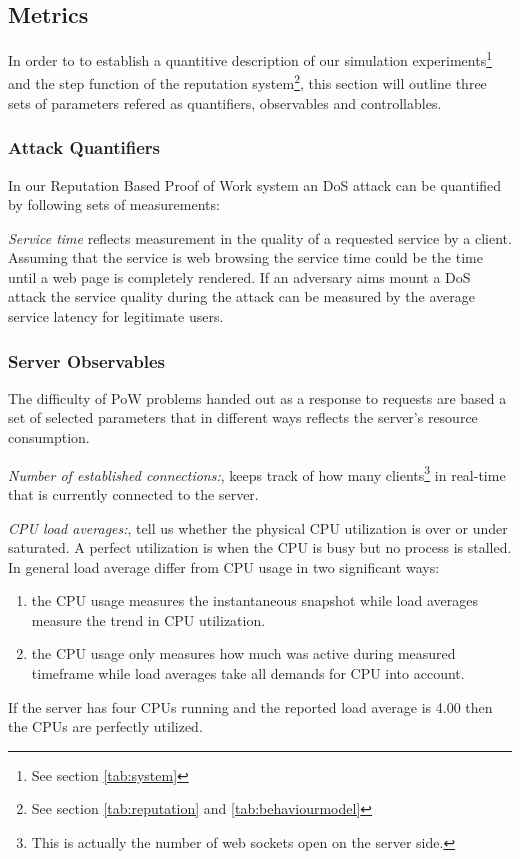 \subsection{Metrics}

In order to to establish a quantitive description of our simulation experiments\footnote{See section \ref{tab:system}} and the step function of the reputation system\footnote{See section \ref{tab:reputation} and \ref{tab:behaviourmodel}}, this section will outline three sets of parameters refered as quantifiers, observables and controllables. 

\subsubsection{Attack Quantifiers}
In our Reputation Based Proof of Work system an DoS attack can be quantified by following sets of measurements: 

\emph{Service time} reflects measurement in the quality of a requested service by a client. Assuming that the service is web browsing the service time could be the time until a web page is completely rendered. If an adversary aims mount a DoS attack the service quality during the attack can be measured by the average service latency for legitimate users. 

\subsubsection{Server Observables}
The difficulty of PoW problems handed out as a response to requests are based a set of selected parameters that in different ways reflects the server's resource consumption.

\emph{Number of established connections:}, keeps track of how many clients\footnote{This is actually the number of web sockets open on the server side.} in real-time that is currently connected to the server.

\emph{CPU load averages:}, tell us whether the physical CPU utilization is over or under saturated. A perfect utilization is when the CPU is busy but no process is stalled. In general load average differ from CPU usage in two significant ways:
\begin{enumerate}
\item the CPU usage measures the instantaneous snapshot while load averages measure the trend in CPU utilization.
\item the CPU usage only measures how much was active during measured timeframe while load averages take all demands for CPU into account.
\end{enumerate}
If the server has four CPUs running and the reported load average is 4.00 then the CPUs are perfectly utilized\cite{cpu}.

